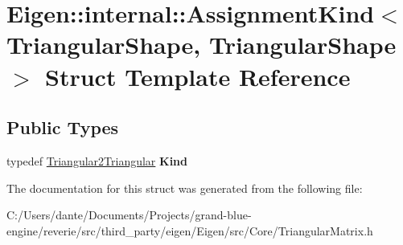 \hypertarget{struct_eigen_1_1internal_1_1_assignment_kind_3_01_triangular_shape_00_01_triangular_shape_01_4}{}\section{Eigen\+::internal\+::Assignment\+Kind$<$ Triangular\+Shape, Triangular\+Shape $>$ Struct Template Reference}
\label{struct_eigen_1_1internal_1_1_assignment_kind_3_01_triangular_shape_00_01_triangular_shape_01_4}
\subsection*{Public Types}
\begin{DoxyCompactItemize}
\item 
\mbox{\label{struct_eigen_1_1internal_1_1_assignment_kind_3_01_triangular_shape_00_01_triangular_shape_01_4_a0c36b9f7d2866f7532ada40d628c313e}} 
typedef \mbox{\hyperlink{struct_eigen_1_1internal_1_1_triangular2_triangular}{Triangular2\+Triangular}} {\bfseries Kind}
\end{DoxyCompactItemize}


The documentation for this struct was generated from the following file\+:\begin{DoxyCompactItemize}
\item 
C\+:/\+Users/dante/\+Documents/\+Projects/grand-\/blue-\/engine/reverie/src/third\+\_\+party/eigen/\+Eigen/src/\+Core/Triangular\+Matrix.\+h\end{DoxyCompactItemize}
